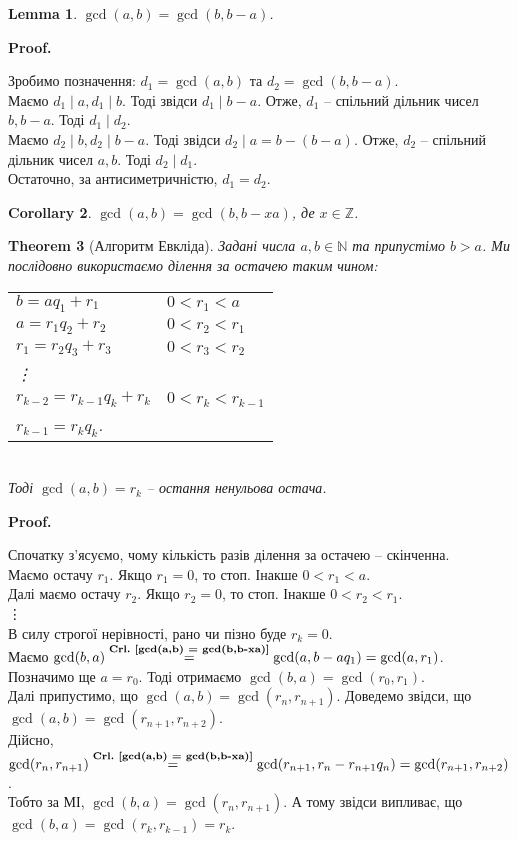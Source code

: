 \documentclass[a4paper, 14pt]{extarticle}
\makeatletter
\theoremstyle{theoremdd}
\newtheorem{theorem}{Theorem}[subsection]
\theoremstyle{theoremdd}
\theoremstyle{theoremdd}
\theoremstyle{theoremdd}
\theoremstyle{theoremdd}
\theoremstyle{theoremdd}
\theoremstyle{theoremdd}
\newtheorem{lemma}[theorem]{Lemma}
\theoremstyle{theoremdd}
\newtheorem{corollary}[theorem]{Corollary}
\def\qed{$\blacksquare$}
\renewenvironment{proof}[1][Proof.\\]{\par
\pushQED{\hfill \qed}%
\normalfont \topsep6\p@\@plus6\p@\relax
\trivlist
\item\relax
{\bfseries
#1\@addpunct{.}}\hspace\labelsep\ignorespaces
}{%
\popQED\endtrivlist\@endpefalse
}
\newcommand\crlref[1]{\textbf{Crl.~\ref{#1}}}
\makeatother
\begin{document}
\begin{lemma}
$\gcd(a,b) = \gcd(b, b-a)$.
\end{lemma}

\begin{proof}
Зробимо позначення: $d_1 = \gcd(a,b)$ та $d_2 = \gcd(b,b-a)$.\\
Маємо $d_1 \mid a, d_1 \mid b$. Тоді звідси $d_1 \mid b -a$. Отже, $d_1$ -- спільний дільник чисел $b, b-a$. Тоді $d_1 \mid d_2$.\\
Маємо $d_2 \mid b, d_2 \mid b-a$. Тоді звідси $d_2 \mid a = b-(b-a)$. Отже, $d_2$ -- спільний дільник чисел $a,b$. Тоді $d_2 \mid d_1$.\\
Остаточно, за антисиметричністю, $d_1 = d_2$.
\end{proof}

\begin{corollary}
\label{gcd(a,b) = gcd(b,b-xa)}
$\gcd(a,b) = \gcd(b, b-xa)$, де $x \in \mathbb{Z}$.
\end{corollary}

\begin{theorem}[Алгоритм Евкліда]
Задані числа $a,b \in \mathbb{N}$ та припустімо $b > a$. Ми послідовно використаємо ділення за остачею таким чином:\\
\begin{tabular}{ll}
$b = aq_1 + r_1$ & $0 < r_1 < a$ \\
$a = r_1q_2 + r_2$ & $0 < r_2 < r_1$ \\
$r_1 = r_2q_3 + r_3$ & $0 < r_3 < r_2$ \\
\vdots \\
$r_{k-2} = r_{k-1}q_k + r_k$ & $0 < r_k < r_{k-1}$ \\
$r_{k-1} = r_k q_k$. &
\end{tabular}\\ 
Тоді $\gcd(a,b) = r_k$ -- остання ненульова остача.
\end{theorem}

\begin{proof}
Спочатку з'ясуємо, чому кількість разів ділення за остачею -- скінченна.\\
Маємо остачу $r_1$. Якщо $r_1 = 0$, то стоп. Інакше $0 < r_1 < a$.\\
Далі маємо остачу $r_2$. Якщо $r_2 = 0$, то стоп. Інакше $0 < r_2 < r_1$.\\
\vdots \\
В силу строгої нерівності, рано чи пізно буде $r_k = 0$.
\bigskip \\
Маємо $\gcd(b,a) \overset{\crlref{gcd(a,b) = gcd(b,b-xa)}}{=} \gcd(a,b-aq_1) = \gcd(a,r_1)$. Позначимо ще $a = r_0$. Тоді отримаємо $\gcd(b,a) = \gcd(r_0,r_1)$.\\
Далі припустимо, що $\gcd(a,b) = \gcd(r_n,r_{n+1})$. Доведемо звідси, що \\ $\gcd(a,b) = \gcd(r_{n+1},r_{n+2})$.\\
Дійсно, $\gcd(r_{n},r_{n+1}) \overset{\crlref{gcd(a,b) = gcd(b,b-xa)}}{=} \gcd(r_{n+1}, r_n - r_{n+1}q_n) = \gcd(r_{n+1}, r_{n+2})$.\\
Тобто за МІ, $\gcd(b,a) = \gcd(r_{n},r_{n+1})$. А тому звідси випливає, що\\
$\gcd(b,a) = \gcd(r_k,r_{k-1}) = r_k$.
\end{proof}
\end{document}
